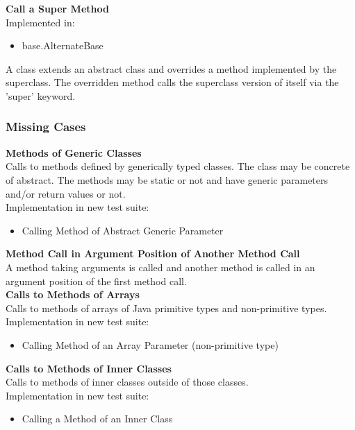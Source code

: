 \documentclass{article}
\begin{document}
\noindent
\textbf{Call a Super Method}\\
Implemented in: 
\begin{itemize}
    \item base.AlternateBase
\end{itemize}
A class extends an abstract class and overrides a method implemented by the superclass. The overridden method calls the superclass version of itself via the 'super' keyword.\\

\subsubsection{Missing Cases}

\textbf{Methods of Generic Classes}\\
Calls to methods defined by generically typed classes. The class may be concrete of abstract. The methods may be static or not and have generic parameters and/or return values or not.\\
Implementation in new test suite: 
\begin{itemize}
    \item Calling Method of Abstract Generic Parameter
\end{itemize}

\noindent
\textbf{Method Call in Argument Position of Another Method Call}\\
A method taking arguments is called and another method is called in an argument position of the first method call.\\

\noindent
\textbf{Calls to Methods of Arrays}\\
Calls to methods of arrays of Java primitive types and non-primitive types.\\
Implementation in new test suite: 
\begin{itemize}
    \item Calling Method of an Array Parameter (non-primitive type)
\end{itemize}

\noindent
\textbf{Calls to Methods of Inner Classes}\\
Calls to methods of inner classes outside of those classes.\\
Implementation in new test suite: 
\begin{itemize}
    \item Calling a Method of an Inner Class
\end{itemize}
\end{document}
